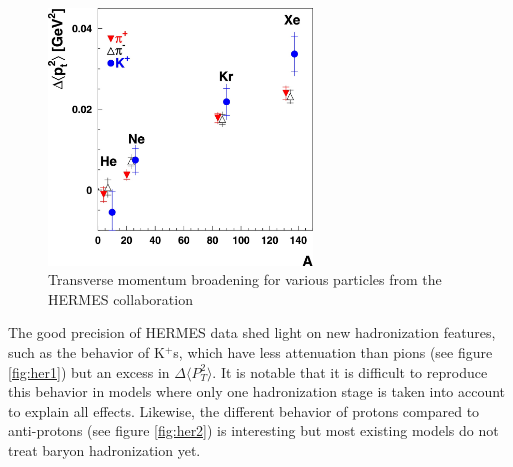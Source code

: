 \begin{figure}[htbp]
\centering
\includegraphics[width=7cm] {fig/Hermes/pthermes.png} 
\caption {Transverse momentum broadening for various particles from the HERMES collaboration \cite{Airapetian:2009jy}}
\label{fig:her3}
\end{figure}

The good precision of HERMES data shed light on new hadronization features, 
such as the behavior of K$^+$s, which have less attenuation than pions (see 
figure \ref{fig:her1}) but an excess in $\Delta \langle P_T^2 \rangle$. It is 
notable that it is difficult to reproduce this behavior in models where only 
one hadronization stage is taken into account to explain all effects. Likewise, 
the different behavior of protons compared to anti-protons (see figure 
\ref{fig:her2}) is interesting but most existing models do not treat baryon 
hadronization yet.

